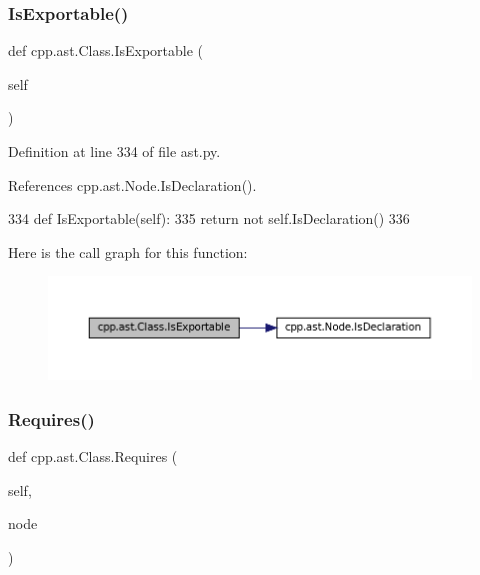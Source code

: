 \subsubsection{\texorpdfstring{Is\+Exportable()}{IsExportable()}}
{\footnotesize\ttfamily def cpp.\+ast.\+Class.\+Is\+Exportable (\begin{DoxyParamCaption}\item[{}]{self }\end{DoxyParamCaption})}



Definition at line 334 of file ast.\+py.



References cpp.\+ast.\+Node.\+Is\+Declaration().


\begin{DoxyCode}
334     \textcolor{keyword}{def }IsExportable(self):
335         \textcolor{keywordflow}{return} \textcolor{keywordflow}{not} self.IsDeclaration()
336 
\end{DoxyCode}
Here is the call graph for this function\+:
\nopagebreak
\begin{figure}[H]
\begin{center}
\leavevmode
\includegraphics[width=350pt]{classcpp_1_1ast_1_1Class_a1ab749f8cfddb0903c6484791f70f42e_cgraph}
\end{center}
\end{figure}
\mbox{\label{classcpp_1_1ast_1_1Class_a347673e0a2a7b840b7d2d1cae13977f7}} 
\subsubsection{\texorpdfstring{Requires()}{Requires()}}
{\footnotesize\ttfamily def cpp.\+ast.\+Class.\+Requires (\begin{DoxyParamCaption}\item[{}]{self,  }\item[{}]{node }\end{DoxyParamCaption})}



